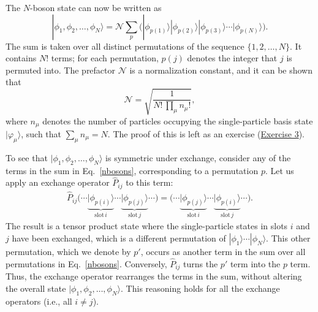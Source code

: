 \documentclass[pra,12pt]{revtex4-2}
\begin{document}
The $N$-boson state can now be written as
\begin{equation}
  |\phi_1,\phi_2,\dots,\phi_N\rangle = \mathcal{N} \sum_p
  \Big(|\phi_{p(1)}\rangle  |\phi_{p(2)}\rangle  |\phi_{p(3)}\rangle  \cdots
  |\phi_{p(N)}\rangle\Big).
  \label{nbosons}
\end{equation}
The sum is taken over all distinct permutations of the sequence
$\{1,2,\dots,N\}$.  It contains $N!$ terms; for each permutation,
$p(j)$ denotes the integer that $j$ is permuted into.  The prefactor
$\mathcal{N}$ is a normalization constant, and it can be shown that
\begin{equation}
  \mathcal{N} = \sqrt{\frac{1}{N!\, \prod_\mu n_\mu!}},
  \label{bosonnorm}
\end{equation}
where $n_\mu$ denotes the number of particles occupying the
single-particle basis state $|\varphi_\mu\rangle$, such that $\sum_\mu
n_\mu = N$.  The proof of this is left as an exercise
(\hyperref[ex:boson_norm]{Exercise 3}).

To see that $|\phi_1,\phi_2,\dots,\phi_N\rangle$ is symmetric under
exchange, consider any of the terms in the sum in Eq.~\eqref{nbosons},
corresponding to a permutation $p$.  Let us apply an exchange operator
$\hat{P}_{ij}$ to this term:
\begin{align}
  \hat{P}_{ij} \Big(\cdots  \underbrace{|\phi_{p(i)}\rangle}_{\mathrm{slot}\,i}  \cdots  \underbrace{|\phi_{p(j)}\rangle}_{\mathrm{slot}\,j}\cdots\Big) = \Big(\cdots  \underbrace{|\phi_{p(j)}\rangle}_{\mathrm{slot}\,i}  \cdots  \underbrace{|\phi_{p(i)}\rangle}_{\mathrm{slot}\,j}\cdots\Big).
\label{pboson}
\end{align}
The result is a tensor product state where the single-particle states
in slots $i$ and $j$ have been exchanged, which is a different
permutation of $|\phi_1\rangle \cdots |\phi_N\rangle$.  This other
permutation, which we denote by $p'$, occurs as another term in the
sum over all permutations in Eq.~\eqref{nbosons}.  Conversely,
$\hat{P}_{ij}$ turns the $p'$ term into the $p$ term.  Thus, the
exchange operator rearranges the terms in the sum, without altering
the overall state $|\phi_1,\phi_2,\dots,\phi_N\rangle$.  This
reasoning holds for all the exchange operators (i.e., all $i \ne j$).
\end{document}
